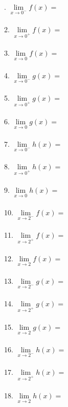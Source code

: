 \documentclass[10pt]{article}
\begin{document}
. $ \lim\limits_{x \to 0^-} f(x) = $ \\
\\
2. $\lim\limits_{x \to 0^+} f(x) =$ \\
\\
3. $\lim\limits_{x \to 0} f(x) =$ \\
\\
4. $\lim\limits_{x \to 0^-} g(x) = $ \\
\\
5. $\lim\limits_{x \to 0^+} g(x) = $ \\
\\
6. $\lim\limits_{x \to 0} g(x) = $ \\
\\
7. $\lim\limits_{x \to 0^-} h(x) = $ \\
\\
8. $\lim\limits_{x \to 0^+} h(x) = $ \\
\\
9. $\lim\limits_{x \to 0} h(x) = $ \\
\\
10. $\lim\limits_{x \to 2^-} f(x) =$ \\
\\
11. $\lim\limits_{x \to 2^+} f(x) =$ \\
\\ 
12. $\lim\limits_{x \to 2} f(x) =$  \\
\\
13. $\lim\limits_{x \to 2^-} g(x) =$  \\
\\
14. $\lim\limits_{x \to 2^+} g(x) = $ \\
\\ 
15. $\lim\limits_{x \to 2} g(x) =$  \\
\\
16. $\lim\limits_{x \to 2^-} h(x) =$  \\
\\
17. $\lim\limits_{x \to 2^+} h(x) = $ \\
\\ 
18. $\lim\limits_{x \to 2} h(x) =  $
\end{document}
